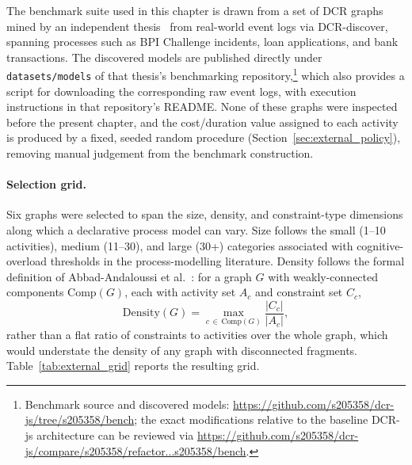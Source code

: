 The benchmark suite used in this chapter is drawn from a set of \ac{DCR}
graphs mined by an independent thesis~\cite{KlbelBlomsterbergEfficientArchitectures} from
real-world event logs via \ac{DCR}-discover, spanning processes such as
BPI Challenge incidents, loan applications, and bank transactions. The
discovered models are published directly under \texttt{datasets/models}
of that thesis's benchmarking repository,\footnote{Benchmark source and
discovered models: \url{https://github.com/s205358/dcr-js/tree/s205358/bench};
the exact modifications relative to the baseline DCR-js architecture can
be reviewed via \url{https://github.com/s205358/dcr-js/compare/s205358/refactor...s205358/bench}.}
which also provides a script for downloading the corresponding raw
event logs, with execution instructions in that repository's README.
None of these graphs were inspected before the present chapter, and the
cost/duration value assigned to each activity is produced by a fixed,
seeded random procedure (Section~\ref{sec:external_policy}),
removing manual judgement from the benchmark construction.

\paragraph{Selection grid.}
Six graphs were selected to span the size, density, and constraint-type
dimensions along which a declarative process model can vary. Size
follows the small (1--10 activities), medium (11--30), and large (30+)
categories associated with cognitive-overload thresholds in the
process-modelling literature. Density follows the formal definition of
Abbad-Andaloussi et al.~\cite{Abbad-Andaloussi2023ComplexityLoad}: for a
graph $G$ with weakly-connected components $\mathrm{Comp}(G)$, each
with activity set $A_c$ and constraint set $C_c$,
\[
  \mathrm{Density}(G) = \max_{c \,\in\, \mathrm{Comp}(G)} \frac{|C_c|}{|A_c|},
\]
rather than a flat ratio of constraints to activities over the whole
graph, which would understate the density of any graph with
disconnected fragments. Table~\ref{tab:external_grid} reports the
resulting grid.

